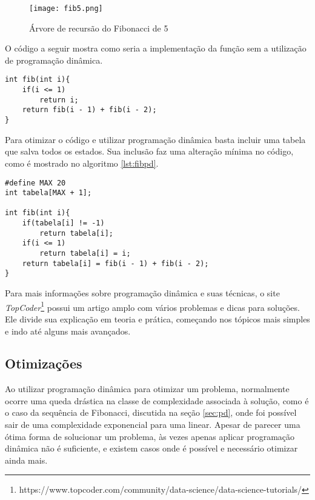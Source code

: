 \begin{figure}[H]
	\centering
	\caption[Árvore de recursão do Fibonacci de 5]{Árvore de recursão do Fibonacci de 5}
	\texttt{[image: fib5.png]} %
	\label{fig:fib5}
\end{figure}


O código a seguir mostra como seria a implementação da função sem a utilização de programação dinâmica.
\begin{lstlisting}[caption={Implementação Fibonacci sem programação dinâmica},label={lst:fibsimples}]
int fib(int i){
	if(i <= 1)
		return i;
	return fib(i - 1) + fib(i - 2);
}

\end{lstlisting}

Para otimizar o código e utilizar programação dinâmica basta incluir uma tabela que salva todos os estados. Sua inclusão faz uma alteração mínima no código, como é mostrado no algoritmo \ref{lst:fibpd}.


\begin{lstlisting}[caption={Implementação Fibonacci com programação dinâmica},label={lst:fibpd}]
#define MAX 20 
int tabela[MAX + 1]; 
					 					 
int fib(int i){
	if(tabela[i] != -1) 
		return tabela[i];
	if(i <= 1)
		return tabela[i] = i;
	return tabela[i] = fib(i - 1) + fib(i - 2);
}
\end{lstlisting}

Para mais informações sobre programação dinâmica e suas técnicas, o site \textit{TopCoder}\footnote{https://www.topcoder.com/community/data-science/data-science-tutorials/} possui um artigo amplo com vários problemas e dicas para soluções. Ele divide sua explicação em teoria e prática, começando nos tópicos mais simples e indo até alguns mais avançados.

\subsection{Otimizações}

Ao utilizar programação dinâmica para otimizar um problema, normalmente ocorre uma queda drástica na classe de complexidade associada à solução, como é o caso da sequência de Fibonacci, discutida na seção \ref{sec:pd}, onde foi possível sair de uma complexidade exponencial para uma linear. Apesar de parecer uma ótima forma de solucionar um problema, às vezes apenas aplicar programação dinâmica não é suficiente, e existem casos onde é possível e necessário otimizar ainda mais.

